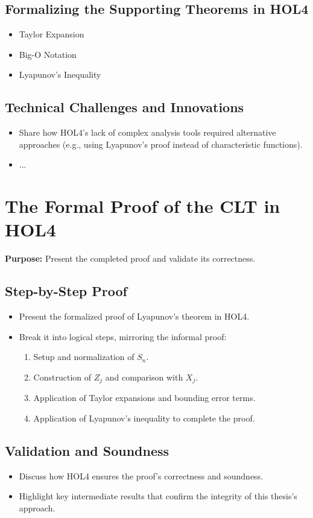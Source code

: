 \subsection{Formalizing the Supporting Theorems in HOL4}
\begin{itemize}
    \item Taylor Expansion
    \item Big-O Notation
    \item Lyapunov’s Inequality
\end{itemize}

\subsection{Technical Challenges and Innovations}
\begin{itemize}
    \item Share how HOL4’s lack of complex analysis tools required alternative approaches (e.g., using Lyapunov’s proof instead of characteristic functions).
    \item ...
\end{itemize}
   
\section{The Formal Proof of the CLT in HOL4}
\textbf{Purpose:} Present the completed proof and validate its correctness.
\subsection{Step-by-Step Proof}
\begin{itemize}
    \item Present the formalized proof of Lyapunov’s theorem in HOL4.
    \item Break it into logical steps, mirroring the informal proof:
    \begin{enumerate}
        \item Setup and normalization of \( S_n \).
        \item Construction of \( Z_j \) and comparison with \( X_j \).
        \item Application of Taylor expansions and bounding error terms.
        \item Application of Lyapunov’s inequality to complete the proof.
    \end{enumerate}
\end{itemize}

\subsection{Validation and Soundness}  
\begin{itemize}
    \item Discuss how HOL4 ensures the proof’s correctness and soundness.
    \item Highlight key intermediate results that confirm the integrity of this thesis's approach.
\end{itemize}   
 
